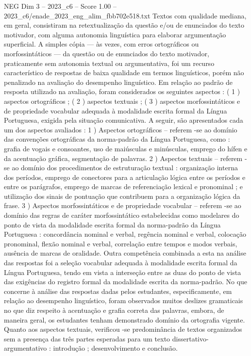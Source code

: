 \begin{textsample}{NEG Dim 3 – 2023\_c6 – Score 1.00 – 2023\_c6/enade\_2023\_eng\_alim\_fbb702e518.txt}
Textos com qualidade mediana, em geral, consistiram na retextualização da questão e/ou de enunciados do texto motivador, com alguma autonomia linguística para elaborar argumentação superficial.
A simples cópia — às vezes, com erros ortográficos ou morfossintáticos — da questão ou de enunciados do texto motivador, praticamente sem autonomia textual ou argumentativa, foi um recurso característico de respostas de baixa qualidade em termos linguísticos, porém não penalizado na avaliação do desempenho linguístico.
Em relação ao padrão de resposta utilizado na avaliação, foram considerados os seguintes aspectos : ( 1 ) aspectos ortográficos ; ( 2 ) aspectos textuais ; ( 3 ) aspectos morfossintáticos e de propriedade vocabular adequada à modalidade escrita formal da Língua Portuguesa, exigida pela situação comunicativa.
A seguir, são apresentados cada um dos aspectos avaliados : 1 ) Aspectos ortográficos – referem -se ao domínio das convenções ortográficas da norma-padrão da Língua Portuguesa, como : grafia de vogais e consoantes, uso de maiúsculas e minúsculas, emprego do hífen e da acentuação gráfica, segmentação de palavras. 2 ) Aspectos textuais – referem -se ao domínio dos procedimentos de estruturação textual : organização interna dos períodos, emprego de conectores para a articulação lógica entre os períodos e entre os parágrafos, emprego de marcas de referenciação lexical e pronominal ; e utilização dos sinais de pontuação que contribuem para a organização lógica da frase. 3 ) Aspectos morfossintáticos e de propriedade vocabular – referem -se ao domínio das regras de caráter morfossintático estabelecidas como modelares do ponto de vista da modalidade escrita formal da norma-padrão da Língua Portuguesa : concordância nominal e verbal, regência nominal e verbal, colocação pronominal, flexão nominal e verbal, correlação entre tempos e modos verbais, ausência de marcas de oralidade.
Outra competência combinada a esta na análise das respostas foi a seleção vocabular adequada à modalidade escrita formal da Língua Portuguesa, tendo em vista a interseção entre as duas do ponto de vista das exigências do registro formal da modalidade escrita da norma-padrão.
No que concerne à análise das respostas dadas pelos estudantes, especificamente, em relação ao desempenho linguístico, foram observados muitos deslizes gramaticais no que diz respeito à acentuação e grafia correta das palavras, embora, de maneira geral, os estudantes tenham demonstrado domínio da ortografia vigente.
Quanto aos aspectos textuais, verificou -se predominância de textos organizados sem a presença das três partes esperadas para um texto dissertativo-argumentativo : introdução ; desenvolvimento e conclusão.

\end{textsample}
